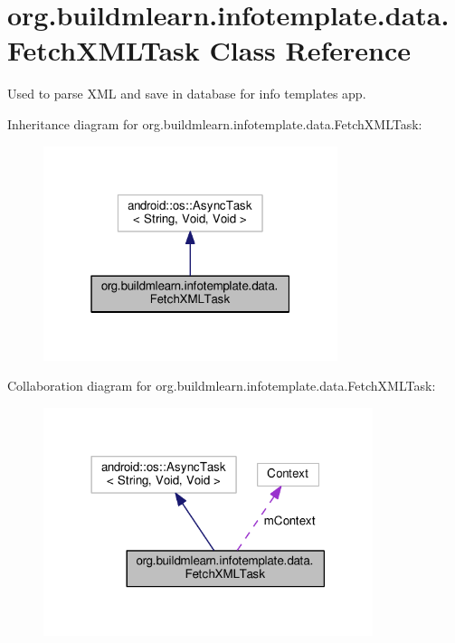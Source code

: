 \hypertarget{classorg_1_1buildmlearn_1_1infotemplate_1_1data_1_1FetchXMLTask}{}\section{org.\+buildmlearn.\+infotemplate.\+data.\+Fetch\+X\+M\+L\+Task Class Reference}
\label{classorg_1_1buildmlearn_1_1infotemplate_1_1data_1_1FetchXMLTask}


Used to parse X\+ML and save in database for info template\textquotesingle{}s app.  




Inheritance diagram for org.\+buildmlearn.\+infotemplate.\+data.\+Fetch\+X\+M\+L\+Task\+:
\nopagebreak
\begin{figure}[H]
\begin{center}
\leavevmode
\includegraphics[width=244pt]{classorg_1_1buildmlearn_1_1infotemplate_1_1data_1_1FetchXMLTask__inherit__graph}
\end{center}
\end{figure}


Collaboration diagram for org.\+buildmlearn.\+infotemplate.\+data.\+Fetch\+X\+M\+L\+Task\+:
\nopagebreak
\begin{figure}[H]
\begin{center}
\leavevmode
\includegraphics[width=273pt]{classorg_1_1buildmlearn_1_1infotemplate_1_1data_1_1FetchXMLTask__coll__graph}
\end{center}
\end{figure}
